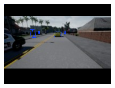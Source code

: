 \documentclass[]{article}
\begin{document}
\begin{figure}[h]
	\centering
	\includegraphics[width=0.5\textwidth]{src/problem3_driving/output/test_2.png}
	\caption{}
	\label{fig:self_driving_results_3}
\end{figure}
\end{document}
